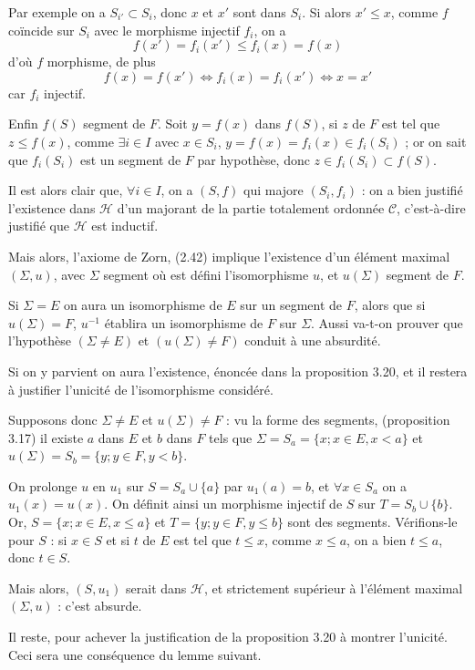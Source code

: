 Par exemple on a $S_{i'}\subset S_i$, donc $x$ et $x'$ sont dans $S_i$. Si alors $x'\le x$, comme $f$ coïncide sur $S_i$ avec le morphisme injectif $f_i$, on a
\[
f(x')=f_i(x')\le f_i(x)=f(x)
\]
d'où $f$ morphisme, de plus
\[
f(x)=f(x')\Leftrightarrow f_i(x)=f_i(x')\Leftrightarrow x=x'
\]
car $f_i$ injectif.

Enfin $f(S)$ segment de $F$. Soit $y=f(x)$ dans $f(S)$, si $z$ de $F$ est tel que $z\le f(x)$, comme $\exists i\in I$ avec $x\in S_i$, $y=f(x)=f_i(x)\in f_i(S_i)$ ; or on sait que $f_i(S_i)$ est un segment de $F$ par hypothèse, donc $z\in f_i(S_i)\subset f(S)$.

Il est alors clair que, $\forall i\in I$, on a $(S,f)$ qui majore $(S_i,f_i)$ : on a bien justifié l'existence dans $\mathcal H$ d'un majorant de la partie totalement ordonnée $\mathcal C$, c'est-à-dire justifié que $\mathcal H$ est inductif.

Mais alors, l'axiome de Zorn, (2.42) implique l'existence d'un élément maximal $(\Sigma,u)$, avec $\Sigma$ segment où est défini l'isomorphisme $u$, et $u(\Sigma)$ segment de $F$.

Si $\Sigma=E$ on aura un isomorphisme de $E$ sur un segment de $F$, alors que si $u(\Sigma)=F$, $u^{-1}$ établira un isomorphisme de $F$ sur $\Sigma$. Aussi va-t-on prouver que l'hypothèse $(\Sigma\ne E)$ et $(u(\Sigma)\ne F)$ conduit à une absurdité.

Si on y parvient on aura l'existence, énoncée dans la proposition 3.20, et il restera à justifier l'unicité de l'isomorphisme considéré.

Supposons donc $\Sigma\ne E$ et $u(\Sigma)\ne F$ : vu la forme des segments, (proposition 3.17) il existe $a$ dans $E$ et $b$ dans $F$ tels que $\Sigma=S_a=\{x;x\in E,x<a\}$ et $u(\Sigma)=S_b=\{y;y\in F,y<b\}$.

On prolonge $u$ en $u_1$ sur $S=S_a\cup\{a\}$ par $u_1(a)=b$, et $\forall x\in S_a$ on a $u_1(x)=u(x)$. On définit ainsi un morphisme injectif de $S$ sur $T=S_b\cup\{b\}$. Or, $S=\{x;x\in E,x\le a\}$ et $T=\{y;y\in F,y\le b\}$ sont des segments. Vérifions-le pour $S$ : si $x\in S$ et si $t$ de $E$ est tel que $t\le x$, comme $x\le a$, on a bien $t\le a$, donc $t\in S$.

Mais alors, $(S,u_1)$ serait dans $\mathcal H$, et strictement supérieur à l'élément maximal $(\Sigma,u)$ : c'est absurde.

Il reste, pour achever la justification de la proposition 3.20 à montrer l'unicité. Ceci sera une conséquence du lemme suivant.


